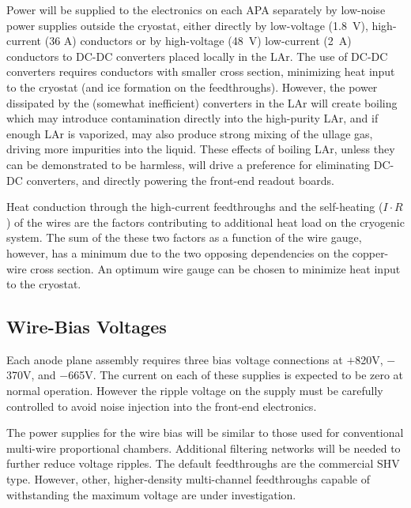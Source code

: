 Power will be supplied to the electronics on each APA separately by low-noise
power supplies outside the cryostat, either directly by
low-voltage (1.8~V), high-current (36 A) conductors or by high-voltage (48~V)
low-current (2~A) conductors to DC-DC converters placed locally in the LAr.
The use of DC-DC converters requires conductors with smaller cross section,
minimizing heat input to the cryostat (and ice formation on the feedthroughs).
However, the power dissipated by the (somewhat inefficient) converters in
the LAr will create boiling which may introduce contamination directly into the 
high-purity LAr, and if enough LAr is vaporized, may also produce strong mixing of the
ullage gas, driving more impurities into the liquid.
These effects of boiling LAr, unless they can be demonstrated to be harmless,
will drive a preference for eliminating DC-DC converters, and directly powering the front-end readout boards.

Heat conduction through the high-current feedthroughs and the self-heating ($I\cdot R$) of the wires are the factors
contributing to additional heat load on the cryogenic system.
The sum of the these two factors as a function of the wire gauge, however, has a minimum 
due to the two opposing dependencies on the copper-wire cross section.
An optimum wire gauge can be chosen to minimize heat input to the cryostat.
%
\subsection{Wire-Bias Voltages}
\label{subsec:ce_feedthrough_wirebias}

Each anode plane assembly requires three bias voltage connections 
at $+$820V, $-$370V, and $-$665V.
The current on each of these supplies is expected to be zero at normal operation.
However the ripple voltage on the supply must be carefully controlled 
to avoid noise injection into the front-end electronics.  

The power supplies for the wire bias will be similar to 
those used for conventional multi-wire proportional chambers. 
Additional filtering networks will 
be needed to further reduce voltage ripples.  
The default feedthroughs are the commercial SHV type.  
However,  other, higher-density multi-channel 
feedthroughs capable of withstanding the maximum voltage are under investigation.  


